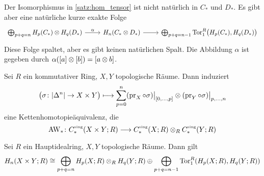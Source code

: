 \begin{bemerkung}
	Der Isomorphismus in \autoref{satz:hom_tensor} ist nicht natürlich in $C_*$ und $D_*$.
	Es gibt aber eine natürliche kurze exakte Folge 
	\[
		\begin{tikzcd}
			\bigoplus_{p+q=n} H_p (C_*) \otimes H_q (D_*) \rar["\alpha"] & H_n(C_* \otimes D_*) \rar & \bigoplus_{p+q=n-1} \Tor_1^R \enbrace[\big]{H_p(C_*), H_q(D_*)}
		\end{tikzcd}
	\]
	Diese Folge spaltet, aber es gibt keinen natürlichen Spalt.
	Die Abbildung $\alpha$ ist gegeben durch $\alpha \enbrace*{[a] \otimes [b]} = \benbrace*{a \otimes b}$.
\end{bemerkung}

\begin{satz}[{name={Eilenberg-Zilber}},label=eilenbergzilber]
	Sei $R$ ein kommutativer Ring, $X,Y$ topologische Räume.
	Dann induziert 
	\[
		\enbrace[\big]{\sigma \colon \abs*{\Delta^n} \to X \times Y } \longmapsto \sum_{p=0}^{n} (\pr_X \circ \sigma)\big|_{\benbrace*{0,\ldots ,p}} \otimes (\pr_Y \circ \sigma)\big|_{p,\ldots ,n}
	\]
	eine Kettenhomotopieäquivalenz, die  
	\[
		\AW_* \colon C^\sing_*(X \times Y;R) \longrightarrow C_*^\sing(X;R) \otimes_R C_*^\sing(Y;R)
	\]
\end{satz}

\begin{korollar}
	Sei $R$ ein Hauptidealring, $X,Y$ topologische Räume.
	Dann gilt
	\[
		H_n(X \times Y;R) \cong \bigoplus_{p+q=n} H_p(X;R) \otimes_R H_q(Y;R) \oplus \bigoplus_{p+q=n-1} \Tor_1^R \enbrace*{H_p(X;R),H_q(Y;R)}
	\]
\end{korollar}

